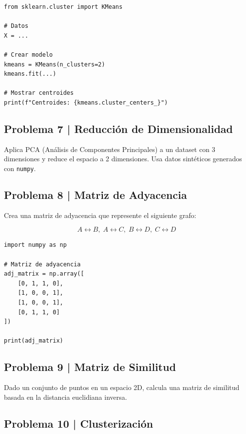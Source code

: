\documentclass{article}
\begin{document}
\begin{lstlisting}[style=python]
from sklearn.cluster import KMeans

# Datos
X = ...

# Crear modelo
kmeans = KMeans(n_clusters=2)
kmeans.fit(...)

# Mostrar centroides
print(f"Centroides: {kmeans.cluster_centers_}")
\end{lstlisting}

\clearpage

\subsection*{Problema 7 | Reducción de Dimensionalidad}

Aplica PCA (Análisis de Componentes Principales) a un dataset con 3 dimensiones y reduce el espacio a 2 dimensiones. Usa datos sintéticos generados con \texttt{numpy}.

\clearpage

\subsection*{Problema 8 | Matriz de Adyacencia}

Crea una matriz de adyacencia que represente el siguiente grafo:

\[
A \leftrightarrow B, \; A \leftrightarrow C, \; B \leftrightarrow D, \; C \leftrightarrow D
\]

\begin{lstlisting}[style=python]
import numpy as np

# Matriz de adyacencia
adj_matrix = np.array([
    [0, 1, 1, 0],
    [1, 0, 0, 1],
    [1, 0, 0, 1],
    [0, 1, 1, 0]
])

print(adj_matrix)
\end{lstlisting}

\clearpage

\subsection*{Problema 9 | Matriz de Similitud}

Dado un conjunto de puntos en un espacio 2D, calcula una matriz de similitud basada en la distancia euclidiana inversa.

\clearpage

\subsection*{Problema 10 | Clusterización}
\end{document}
